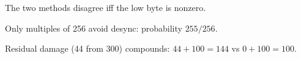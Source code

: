\begin{theorem}\label{thm:desync_iff_low}
  \leanok
  The two methods disagree iff the low byte is nonzero.
\end{theorem}

\begin{theorem}\label{thm:only_zero_lo}
  \leanok
  Only multiples of 256 avoid desync: probability $255/256$.
\end{theorem}

\begin{theorem}\label{thm:residual_corrupts}
  \leanok
  Residual damage (44 from 300) compounds: $44 + 100 = 144$ vs $0 + 100 = 100$.
\end{theorem}
